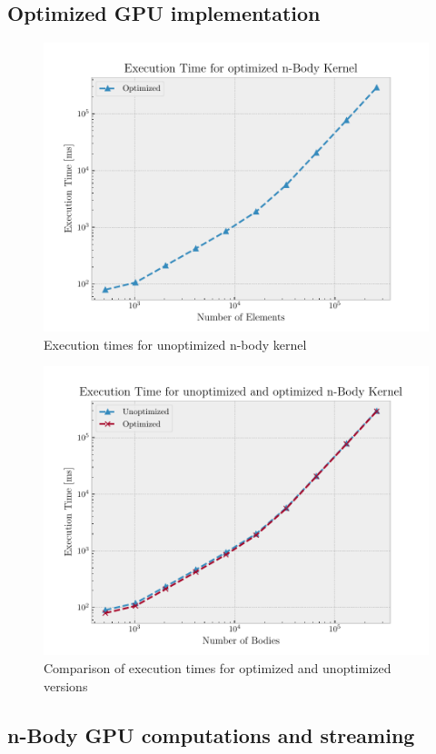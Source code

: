 \documentclass[12pt]{article}
\begin{document}
\subsection{Optimized GPU implementation}
\begin{figure}[H]
	\centering
	\includegraphics[width=0.9\linewidth]{./plot/time_vs_elems_opt.pdf}
	\caption{Execution times for unoptimized n-body kernel}%
	\label{fig:time_vs_elems_opt}
\end{figure}

\begin{figure}[H]
	\centering
	\includegraphics[width=0.9\linewidth]{./plot/time_vs_elems_both.pdf}
	\caption{Comparison of execution times for optimized and unoptimized versions}%
	\label{fig:time_vs_elems_both}
\end{figure}

\subsection{n-Body GPU computations and streaming}
\end{document}
